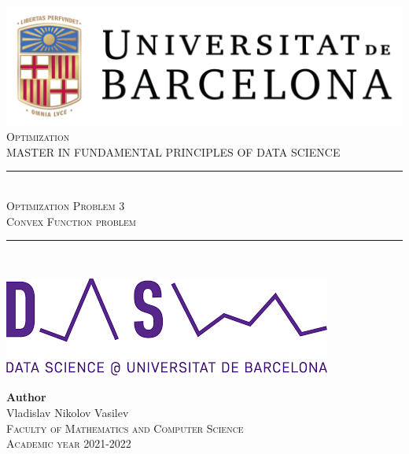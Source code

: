 \documentclass[11pt,a4paper]{article}
\newcommand{\subject}{Optimization}
\newcommand{\autor}{Vladislav Nikolov Vasilev}
\newcommand{\titulo}{Optimization Problem 3}
\newcommand{\subtitulo}{Convex Function problem}
\newcommand{\masters}{Master in Fundamental Principles of Data Science}
\begin{document}

\begin{titlepage}
  \begin{minipage}{\textwidth}
    \centering
    \includegraphics[scale=0.25]{img/ub-logo}\\[2cm]
    
    \textsc{\Large \subject\\[0.5cm]}
    \textsc{\uppercase\expandafter{\masters}}\\[1.5cm]
    
    \noindent\rule[-1ex]{\textwidth}{1pt}\\[1.5ex]
    \textsc{{\Huge \titulo\\[0.5ex]}}
    \textsc{{\Large \subtitulo\\}}
    \noindent\rule[-1ex]{\textwidth}{2pt}\\[3.5ex]
  \end{minipage}
  
  \vspace{2cm}
  
  \begin{minipage}{\textwidth}
    \centering
    
    \includegraphics[scale=0.4]{img/ub-ds-logo}
    \vspace{2cm}
    
    \textbf{Author}\\ {\autor{}}\\[2.5ex]
    \textsc{Faculty of Mathematics and Computer Science}\\
    \vspace{1em}
    \textsc{Academic year 2021-2022}
  \end{minipage}
\end{titlepage}
\end{document}
